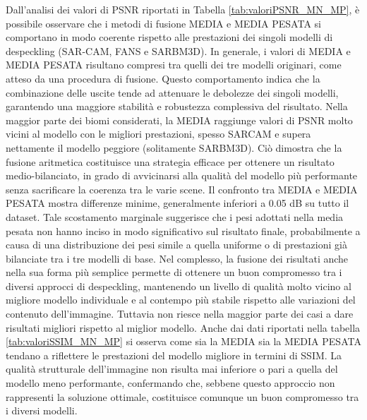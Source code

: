 Dall’analisi dei valori di PSNR riportati in Tabella \ref{tab:valoriPSNR_MN_MP}, è possibile osservare che i metodi di fusione 
MEDIA e MEDIA PESATA si comportano in modo coerente rispetto alle prestazioni dei singoli modelli di despeckling (SAR-CAM, FANS e SARBM3D). 
In generale, i valori di MEDIA e MEDIA PESATA risultano compresi tra quelli dei tre modelli originari, come atteso da una procedura di 
fusione. Questo comportamento indica che la combinazione delle uscite tende ad attenuare le debolezze dei singoli modelli, garantendo una 
maggiore stabilità e robustezza complessiva del risultato.
Nella maggior parte dei biomi considerati, la MEDIA raggiunge valori di PSNR molto vicini al modello con le migliori prestazioni, spesso SARCAM e 
supera nettamente il modello peggiore (solitamente SARBM3D). Ciò dimostra che la fusione aritmetica costituisce una strategia efficace per 
ottenere un risultato medio-bilanciato, in grado di avvicinarsi alla qualità del modello più performante senza sacrificare la coerenza tra le varie scene.
Il confronto tra MEDIA e MEDIA PESATA mostra differenze minime, generalmente inferiori a 0.05 dB su tutto il dataset. Tale scostamento 
marginale suggerisce che i pesi adottati nella media pesata non hanno inciso in modo significativo sul risultato finale, probabilmente a 
causa di una distribuzione dei pesi simile a quella uniforme o di prestazioni già bilanciate tra i tre modelli di base.
Nel complesso, la fusione dei risultati anche nella sua forma più semplice permette di ottenere un buon compromesso tra i diversi 
approcci di despeckling, mantenendo un livello di qualità molto vicino al migliore modello individuale e al contempo più 
stabile rispetto alle variazioni del contenuto dell’immagine. Tuttavia non riesce nella maggior parte dei casi a dare 
risultati migliori rispetto al miglior modello.
Anche dai dati riportati nella tabella \ref{tab:valoriSSIM_MN_MP} si osserva come sia la MEDIA sia la MEDIA PESATA 
tendano a riflettere le prestazioni del modello migliore in termini di SSIM. La qualità strutturale dell’immagine 
non risulta mai inferiore o pari a quella del modello meno performante, confermando che, sebbene questo 
approccio non rappresenti la soluzione ottimale, costituisce comunque un buon compromesso tra i diversi modelli.
